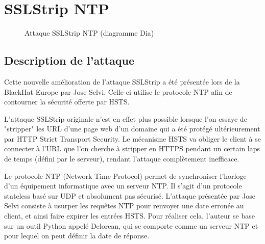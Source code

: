 \chapter{SSLStrip NTP}

\label{sec:sslstrip-ntp}

\begin{figure}[H]
  \caption{Attaque SSLStrip NTP (diagramme Dia)}
\end{figure}

\section{Description de l'attaque}

Cette nouvelle amélioration de l'attaque SSLStrip a été présentée lors de la BlackHat Europe par Jose Selvi. Celle-ci utilise le protocole NTP afin de contourner la sécurité offerte par HSTS.

L'attaque SSLStrip originale n'est en effet plus possible lorsque l'on essaye de "stripper" les URL d'une page web d'un domaine qui a été protégé ultérieurement par HTTP Strict Transport Security. Le mécanisme HSTS va obliger le client à se connecter à l'URL que l'on cherche à stripper en HTTPS pendant un certain laps de temps (défini par le serveur), rendant l'attaque complètement inefficace.

Le protocole NTP (Network Time Protocol) permet de synchroniser l'horloge d'un équipement informatique avec un serveur NTP. Il s'agit d'un protocole stateless basé sur UDP et absolument pas sécurisé. L'attaque présentée par Jose Selvi consiste à usurper les requêtes NTP pour renvoyer une date erronée au client, et ainsi faire expirer les entrées HSTS. Pour réaliser cela, l'auteur se base sur un outil Python appelé Delorean, qui se comporte comme un serveur NTP et pour lequel on peut définir la date de réponse.


